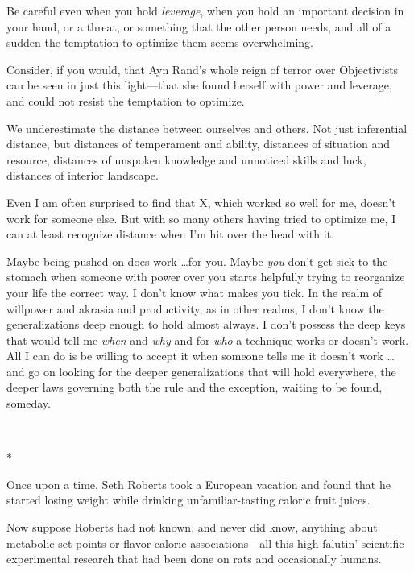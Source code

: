 {
 Be careful even when you hold \textit{leverage}, when you hold an
important decision in your hand, or a threat, or something that the
other person needs, and all of a sudden the temptation to optimize them
seems overwhelming.}

{
 Consider, if you would, that Ayn Rand's whole
reign of terror over Objectivists can be seen in just this light---that
she found herself with power and leverage, and could not resist the
temptation to optimize.}

{
 We underestimate the distance between ourselves and others. Not
just inferential distance, but distances of temperament and ability,
distances of situation and resource, distances of unspoken knowledge
and unnoticed skills and luck, distances of interior landscape.}

{
 Even I am often surprised to find that X, which worked so well for
me, doesn't work for someone else. But with so many
others having tried to optimize me, I can at least recognize distance
when I'm hit over the head with it.}

{
 Maybe being pushed on does work \ldots for you. Maybe \textit{you}
don't get sick to the stomach when someone with power
over you starts helpfully trying to reorganize your life the correct
way. I don't know what makes you tick. In the realm of
willpower and akrasia and productivity, as in other realms, I
don't know the generalizations deep enough to hold
almost always. I don't possess the deep keys that would
tell me \textit{when} and \textit{why} and for \textit{who} a technique
works or doesn't work. All I can do is be willing to
accept it when someone tells me it doesn't work \ldots
and go on looking for the deeper generalizations that will hold
everywhere, the deeper laws governing both the rule and the exception,
waiting to be found, someday.}

{\centering
 \ ~
\par}

{\centering
 *
\par}


{
 Once upon a time, Seth Roberts took a European vacation and found
that he started losing weight while drinking unfamiliar-tasting caloric
fruit juices. }

{
 Now suppose Roberts had not known, and never did know, anything
about metabolic set points or flavor-calorie associations---all this
high-falutin' scientific experimental research that had
been done on rats and occasionally humans.}


